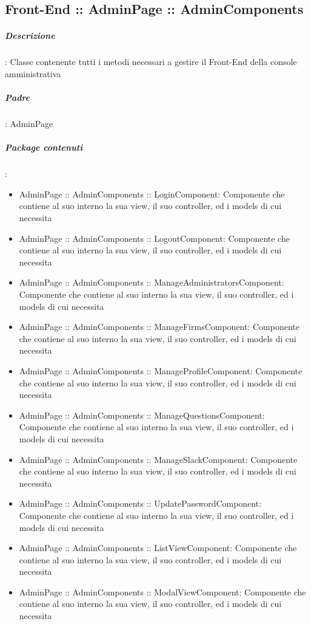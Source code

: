 \documentclass[../ManualeSviluppatore_v1.0.0.tex]{subfiles}
\begin{document}
	\subsection{Front-End :: AdminPage :: AdminComponents}

		\subparagraph{Descrizione}: Classe contenente tutti i metodi necessari a gestire il Front-End della console amministrativa
		\subparagraph{Padre}: AdminPage
		\subparagraph{Package contenuti}:
		\begin{itemize}
			\item AdminPage :: AdminComponents :: LoginComponent: Componente che contiene al suo interno la sua view, il suo controller, ed i models di cui necessita
			\item AdminPage :: AdminComponents :: LogoutComponent: Componente che contiene al suo interno la sua view, il suo controller, ed i models di cui necessita
			\item AdminPage :: AdminComponents :: ManageAdministratorsComponent: Componente che contiene al suo interno la sua view, il suo controller, ed i models di cui necessita
			\item AdminPage :: AdminComponents :: ManageFirmsComponent: Componente che contiene al suo interno la sua view, il suo controller, ed i models di cui necessita
			\item AdminPage :: AdminComponents :: ManageProfileComponent: Componente che contiene al suo interno la sua view, il suo controller, ed i models di cui necessita
			\item AdminPage :: AdminComponents :: ManageQuestionsComponent: Componente che contiene al suo interno la sua view, il suo controller, ed i models di cui necessita
			\item AdminPage :: AdminComponents :: ManageSlackComponent: Componente che contiene al suo interno la sua view, il suo controller, ed i models di cui necessita
			\item AdminPage :: AdminComponents :: UpdatePasswordComponent: Componente che contiene al suo interno la sua view, il suo controller, ed i models di cui necessita
			\item AdminPage :: AdminComponents :: ListViewComponent: Componente che contiene al suo interno la sua view, il suo controller, ed i models di cui necessita
			\item AdminPage :: AdminComponents :: ModalViewComponent: Componente che contiene al suo interno la sua view, il suo controller, ed i models di cui necessita
		\end{itemize}
\end{document}

